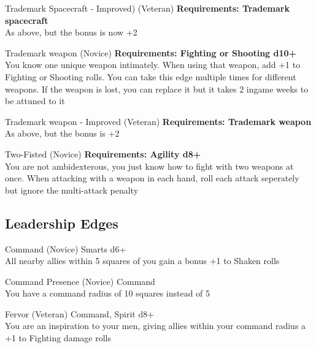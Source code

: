 \begin{multicols}{2}
\begin{genericsection}{Trademark Spacecraft - Improved) (Veteran)}
\textbf{Requirements: Trademark spacecraft}\\
As above, but the bonus is now +2
\end{genericsection}

\begin{genericsection}{Trademark weapon (Novice)}
\textbf{Requirements: Fighting or Shooting d10+}\\
You know one unique weapon intimately. When using that weapon, add +1 to Fighting or Shooting rolls. You can take this edge multiple times for different weapons. If the weapon is lost, you can replace it but it takes 2 ingame weeks to be attuned to it
\end{genericsection}

\begin{genericsection}{Trademark weapon - Improved (Veteran)}
\textbf{Requirements: Trademark weapon}\\
As above, but the bonus is +2
\end{genericsection}

\begin{genericsection}{Two-Fisted (Novice)}
\textbf{Requirements: Agility d8+}\\
You are not ambidexterous, you just know how to fight with two weapons at once. When attacking with a weapon in each hand, roll each attack seperately but ignore the multi-attack penalty
\end{genericsection}

%
%
\subsection{Leadership Edges}

\begin{genericsection}{Command (Novice)}
Smarts d6+\\
All nearby allies within 5 squares of you gain a bonus +1 to Shaken rolls
\end{genericsection}

\begin{genericsection}{Command Presence (Novice)}
Command\\
You have a command radius of 10 squares instead of 5
\end{genericsection}

\begin{genericsection}{Fervor (Veteran)}
Command, Spirit d8+\\
You are an inspiration to your men, giving allies within your command radius a +1 to Fighting damage rolls
\end{genericsection}


\end{multicols}
